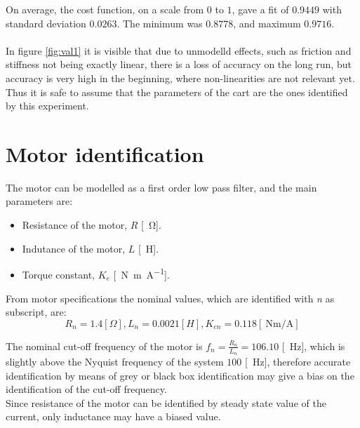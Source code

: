 On average, the cost function, on a scale from $0$ to $1$, gave a fit of $ 0.9449$ with standard deviation $0.0263$.
The minimum was $0.8778$, and maximum $ 0.9716$. \\ \\ 
In figure \ref{fig:val1} it is visible that due to unmodelld effects, such as friction and stiffness not being exactly linear, there is a loss of accuracy on the long run, but accuracy is very high in the beginning, where non-linearities are not relevant yet. Thus it is safe to assume that the parameters of the cart are the ones identified by this experiment.
\newpage

\section{Motor identification}
The motor can be modelled as a first order low pass filter, and the main parameters are:
\begin{itemize}
\item Resistance of the motor, $R$ [\SI{}{\ohm}].
\item Indutance of the motor, $L$ [\SI{}{\henry}].
\item Torque constant, $K_e$ [\SI{}{\newton \metre \per \ampere}].
\end{itemize}
From motor specifications the nominal values, which are identified with \emph{n} as subscript, are:
$$R_n = 1.4 [\Omega], L_n = 0.0021 [H], K_{en} =0.118 [\SI{}{\newton\metre \per\ampere}]$$

The nominal cut-off frequency of the motor  is $f_n = 	\frac{R_n}{L_n} = 106.10$ [\SI{}{\hertz}], which is slightly above the Nyquist frequency of the system $100$ [\SI{}{\hertz}], therefore accurate identification by means of grey or black box identification may give a bias on the identification of the cut-off frequency. \\ Since resistance of the motor can be identified by  steady state value of the current, only inductance may have a biased value. \\ \\

